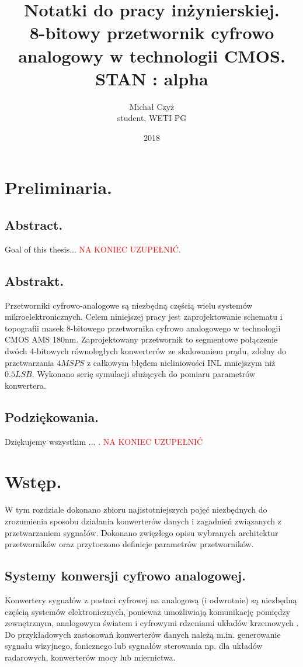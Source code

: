 \documentclass[10pt,a4paper]{report}
\title{Notatki do pracy inżynierskiej. \\ 8-bitowy przetwornik cyfrowo analogowy w technologii CMOS. \\ STAN : alpha}
\date{2018}
\author{Michał Czyż \\ student, WETI PG}
\theoremstyle{definition}
\theoremstyle{definition}
\theoremstyle{definition}
\theoremstyle{definition}
\theoremstyle{definition}
\begin{document}
	\maketitle
	
	\tableofcontents
	\newpage
	\chapter{Preliminaria.}
	\section{Abstract.}
	{	Goal of this thesis... \textcolor{red}{NA KONIEC UZUPEŁNIĆ.} }

	\section{Abstrakt.}
	{	Przetworniki cyfrowo-analogowe są niezbędną częścią wielu systemów mikroelektronicznych. Celem niniejszej pracy jest zaprojektowanie schematu i topografii masek 8-bitowego przetwornika cyfrowo analogowego w technologii CMOS AMS 180nm. Zaprojektowany przetwornik to segmentowe połączenie dwóch 4-bitowych równoległych konwerterów ze skalowaniem prądu, zdolny do przetwarzania $4MSPS$ z całkowym błędem nieliniowości INL mniejszym niż $0.5LSB$. Wykonano serię symulacji służących do pomiaru parametrów konwertera.}
	
	\section{Podziękowania.}
	{	Dziękujemy wszystkim ... . \textcolor{red}{NA KONIEC UZUPEŁNIĆ} }
	
	\chapter{Wstęp.}
	{	W tym rozdziale dokonano zbioru najistotniejszych pojęć niezbędnych do zrozumienia sposobu działania konwerterów danych i zagadnień związanych z przetwarzaniem sygnałów. Dokonano zwięzłego opisu wybranych architektur przetworników oraz przytoczono definicje parametrów przetworników.}
	

	\section{Systemy konwersji cyfrowo analogowej.}
	{	Konwertery sygnałów z postaci cyfrowej na analogową (i odwrotnie) są niezbędną częścią systemów elektronicznych, ponieważ umożliwiają komunikację pomiędzy zewnętrznym, analogowym światem i cyfrowymi rdzeniami układów krzemowych \cite{integconv}. Do przykładowych zastosowań konwerterów danych należą m.in. generowanie sygnału wizyjnego, fonicznego lub sygnałów sterowania np. dla układów radarowych, konwerterów mocy lub miernictwa. }
	
\end{document}
